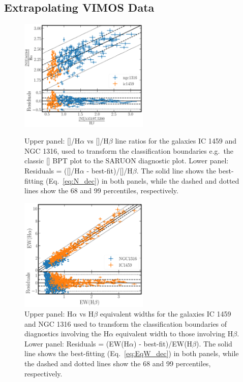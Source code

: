 	\subsection{Extrapolating VIMOS Data}
		\label{subsec:Ndec}
		\begin{figure}
			\centering
			\includegraphics[width=0.55\textwidth]{chapter5/ratio_fit.png}
			\caption[/H$\alpha$ vs /H$\beta$]{Upper panel: []/H$\alpha$ vs []/H$\beta$ line ratios for the galaxies IC 1459 and NGC 1316, used to transform the classification boundaries e.g.\ the classic [] BPT plot to the SARUON diagnostic plot. Lower panel: Residuals = ([]/H$\alpha$ - best-fit)/[]/H$\beta$. The solid line shows the best-fitting (Eq.\ \ref{eq:N_dec}) in both panels, while the dashed and dotted lines show the 68 and 99 percentiles, respectively.\label{fig:ratio_relation}}

			\includegraphics[width=0.55\textwidth]{chapter5/EQw_fit.png}
			\caption[Comparing H$\alpha$ and H$\beta$ equivalent widths]{Upper panel: H$\alpha$ vs H$\beta$ equivalent widths for the galaxies IC 1459 and NGC 1316 used to transform the classification boundaries of diagnostics involving the H$\alpha$ equivalent width to those involving H$\beta$. Lower panel: Residuals = (EW(H$\alpha$) - best-fit)/EW(H$\beta$). The solid line shows the best-fitting (Eq.\ \ref{eq:EqW_dec}) in both panels, while the dashed and dotted lines show the 68 and 99 percentiles, respectively.\label{fig:EqW_relation}}
		\end{figure}

